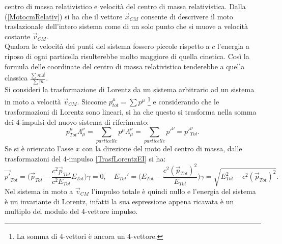 centro di massa relativistico e velocità del centro di massa relativistica. Dalla (\ref{MotocmRelativ}) si ha che il vettore $\vec x_{CM}$ consente di descrivere il moto traslazionale dell'intero sistema come di un solo punto che si muove a velocità  costante $\vec v_{CM}$.\\
 Qualora le velocità dei punti del sistema fossero piccole rispetto a $c$ l'energia a riposo di ogni particella risulterebbe molto maggiore di quella cinetica. Così la formula delle coordinate del centro di massa relativistico tenderebbe a quella classica $\frac{\sum m\vec{x}}{\sum m}$.\\

Si consideri la trasformazione di Lorentz da un sistema arbitrario ad un sistema in moto a velocità $\vec v_{CM}$. Siccome $p_{tot}^\mu=\sum p^\mu$ \footnote{La somma di 4-vettori è ancora un 4-vettore.} e considerando che le trasformazioni di Lorentz sono lineari, si ha che questo si trasforma nella somma dei 4-impulsi del nuovo sistema di riferimento:
\begin{equation*}
    p^\mu_{Tot}\Lambda_\mu^\nu=\sum_{particelle} p^\mu\Lambda_\mu^\nu=\sum_{particelle} p'^\nu=p'^\nu_{Tot}.
\end{equation*}
Se si è orientato l'asse $x$ con la direzione del moto del centro di massa, dalle trasformazioni del 4-impulso \eqref{TrasfLorentzEI} si ha:
\begin{equation*}
    \vec{p'}_{Tot}=\bigg( \vec{p}_{Tot}-\frac{c^2 \vec{p}_{Tot}}{c^2 E_{Tot}}E_{Tot}\bigg)\gamma=0, \quad E_{Tot}'=\bigg(E_{Tot}-\frac{c^2(\vec{p}_{Tot})^2}{E_{Tot}}\bigg)\gamma=\sqrt{E^2_{Tot}-c^2(\vec{p}_{Tot})^2}. 
\end{equation*}
Nel sistema in moto a $\vec v_{CM}$ l'impulso totale è quindi nullo e l'energia del sistema è un invariante di Lorentz, infatti la sua espressione appena ricavata è un multiplo del modulo del 4-vettore impulso.